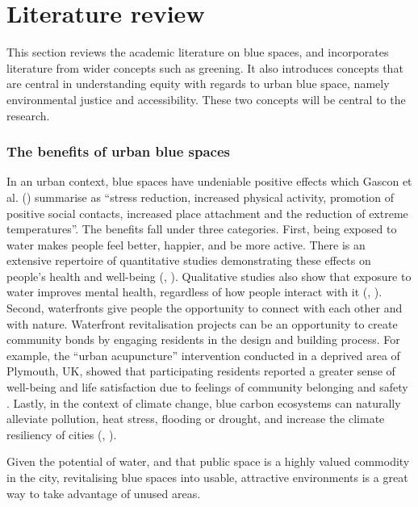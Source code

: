 \documentclass{article}
\begin{document}
\pagebreak
\section{Literature review}

This section reviews the academic literature on blue spaces, and incorporates literature from wider concepts such as greening. It also introduces concepts that are central in understanding equity with regards to urban blue space, namely environmental justice and accessibility. These two concepts will be central to the research.

\subsubsection{The benefits of urban blue spaces}

In an urban context, blue spaces have undeniable positive effects which Gascon et al. (\citeyear{gascon2017outdoor}) summarise as ``stress reduction, increased physical activity, promotion of positive social contacts, increased place attachment and the reduction of extreme temperatures''. The benefits fall under three categories.
First, being exposed to water makes people feel better, happier, and be more active. There is an extensive repertoire of quantitative studies demonstrating these effects on people's health and well-being (\cite{gascon2017outdoor}, \cite{britton2020blue}).
Qualitative studies also show that exposure to water improves mental health, regardless of how people interact with it (\cite{garrett2019urban}, \cite{van2021urban}).
Second, waterfronts give people the opportunity to connect with each other and with nature. Waterfront revitalisation projects can be an opportunity to create community bonds by engaging residents in the design and building process. For example, the ``urban acupuncture'' intervention conducted in a deprived area of Plymouth, UK, showed that participating residents reported a greater sense of well-being and life satisfaction due to feelings of community belonging and safety \parencite{van2021urban}.
Lastly, in the context of climate change, blue carbon ecosystems can naturally alleviate pollution, heat stress, flooding or drought, and increase the climate resiliency of cities (\cite{lin2020water}, \cite{o2021international}). 

Given the potential of water, and that public space is a highly valued commodity in the city, revitalising blue spaces into usable, attractive environments is a great way to take advantage of unused areas.
 
\end{document}

